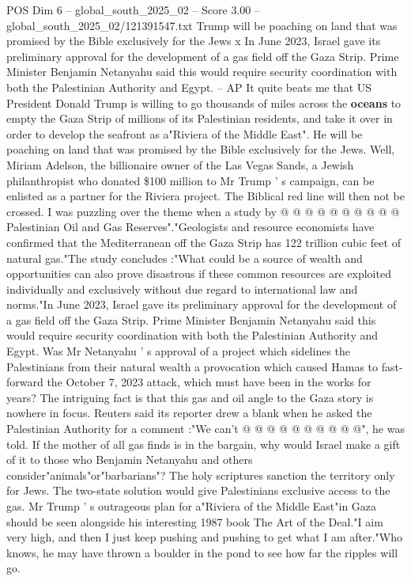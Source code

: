 \begin{textsample}{POS Dim 6 – global\_south\_2025\_02 – Score 3.00 – global\_south\_2025\_02/121391547.txt}  \label{ex:f6_pos_408}
Trump will be poaching on land that was promised by the Bible exclusively for the Jews x In June 2023, Israel gave its preliminary approval for the development of a gas field off the Gaza Strip.
Prime Minister Benjamin Netanyahu said this would require security coordination with both the Palestinian Authority and Egypt. -- AP It quite beats me that US President Donald Trump is willing to go thousands of miles across the \textbf{oceans} to empty the Gaza Strip of millions of its Palestinian residents, and take it over in order to develop the seafront as a"Riviera of the Middle East".
He will be poaching on land that was promised by the Bible exclusively for the Jews.
Well, Miriam Adelson, the billionaire owner of the Las Vegas Sands, a Jewish philanthropist who donated \$100 million to Mr Trump ' s campaign, can be enlisted as a partner for the Riviera project.
The Biblical red line will then not be crossed.
I was puzzling over the theme when a study by @ @ @ @ @ @ @ @ @ @ Palestinian Oil and Gas Reserves"."Geologists and resource economists have confirmed that the Mediterranean off the Gaza Strip has 122 trillion cubic feet of natural gas."The study concludes :"What could be a source of wealth and opportunities can also prove disastrous if these common resources are exploited individually and exclusively without due regard to international law and norms."In June 2023, Israel gave its preliminary approval for the development of a gas field off the Gaza Strip.
Prime Minister Benjamin Netanyahu said this would require security coordination with both the Palestinian Authority and Egypt.
Was Mr Netanyahu ' s approval of a project which sidelines the Palestinians from their natural wealth a provocation which caused Hamas to fast-forward the October 7, 2023 attack, which must have been in the works for years?
The intriguing fact is that this gas and oil angle to the Gaza story is nowhere in focus.
Reuters said its reporter drew a blank when he asked the Palestinian Authority for a comment :"We can't @ @ @ @ @ @ @ @ @ @", he was told.
If the mother of all gas finds is in the bargain, why would Israel make a gift of it to those who Benjamin Netanyahu and others consider"animals"or"barbarians"?
The holy scriptures sanction the territory only for Jews.
The two-state solution would give Palestinians exclusive access to the gas.
Mr Trump ' s outrageous plan for a"Riviera of the Middle East"in Gaza should be seen alongside his interesting 1987 book The Art of the Deal."I aim very high, and then I just keep pushing and pushing to get what I am after."Who knows, he may have thrown a boulder in the pond to see how far the ripples will go.

\end{textsample}
